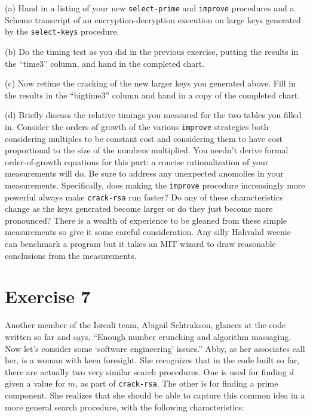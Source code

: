 (a) Hand in a listing of your new {\tt select-prime} and {\tt improve}
procedures and a {\sc Scheme} transcript of an encryption-decryption execution
on large keys generated by the {\tt select-keys} procedure.

(b) Do the timing test as you did in the previous exercise, putting the results
in the ``time3'' column, and hand in the completed chart.

(c) Now retime the cracking of the new larger keys you generated above.
Fill in the results in the ``bigtime3'' column and hand in a copy of the
completed chart.

(d) Briefly discuss the relative timings you measured for the two tables you
filled in.  Consider the orders of growth of the various {\tt improve}
strategies both considering multiples to be constant cost and considering them
to have cost proportional to the size of the numbers multiplied. You needn't
derive formal order-of-growth equations for this part: a concise
rationalization of your measurements will do. Be sure to address any unexpected
anomolies in your measurements. Specifically, does making the {\tt improve}
procedure increasingly more powerful always make {\tt crack-rsa} run faster? Do
any of these characteristics change as the keys generated become larger or do
they just become more pronounced? There is a wealth of experience to be gleaned
from these simple measurements so give it some careful consideration. Any silly
Hahvahd weenie can benchmark a program but it takes an MIT wizard to draw
reasonable conclusions from the measurements.

\section{Exercise 7}

Another member of the Isreali team, Abigail Schtrakson, glances at the code
written so far and says, ``Enough number crunching and algorithm massaging. Now let's
consider some `software engineering' issues.'' Abby, as her associates call
her, is a woman with keen foresight.  She recognizes that
in the code built so far, there are actually two very similar
search procedures.  One is used for finding $d$ given a value for $m$,
as part of {\tt crack-rsa}.  The other is for finding a prime
component.  She realizes that she should be able to capture this
common idea in a more general search procedure, with the following
characteristics:

